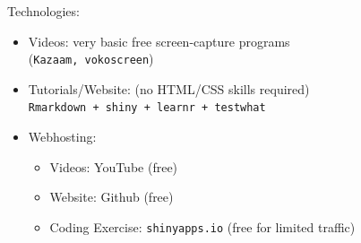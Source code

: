 \documentclass[10pt]{beamer}
\begin{document}
\begin{frame}

Technologies:

\begin{itemize}
\item Videos: very basic free screen-capture programs\\ (\texttt{Kazaam, vokoscreen})
\item Tutorials/Website: (no HTML/CSS skills required)\\
\texttt{Rmarkdown + shiny + learnr + testwhat}
\item Webhosting:
\begin{itemize}
 \item Videos: YouTube (free)
 \item Website: Github (free)
 \item Coding Exercise: \texttt{shinyapps.io} (free for limited traffic)
\end{itemize}
\end{itemize}
\end{frame}
\end{document}
